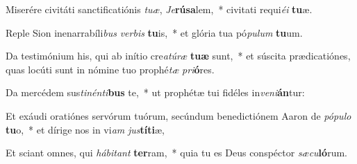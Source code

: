 \item Miserére civitáti sanctificatiónis \textit{tu}\textit{æ}, \textit{Je}\textbf{rú}\textbf{sa}lem,~* civitati requi\textit{é}\textit{i} \textbf{tu}æ.
\item Reple Sion inenarrabíli\textit{bus} \textit{ver}\textit{bis} \textbf{tu}is,~* et glória tua pó\textit{pu}\textit{lum} \textbf{tu}um.
\item Da testimónium his, qui ab inítio cre\textit{a}\textit{tú}\textit{ræ} \textbf{tu}\textbf{æ} sunt,~* et súscita prædicatiónes, quas locúti sunt in nómine tuo prophé\textit{tæ} \textit{pri}\textbf{ó}res.
\item Da mercédem sus\textit{ti}\textit{nén}\textit{ti}\textbf{bus} te,~* ut prophétæ tui fidéles in\textit{ve}\textit{ni}\textbf{án}tur:
\item Et exáudi oratiónes servórum tuórum, secúndum benedictiónem Aaron de \textit{pó}\textit{pu}\textit{lo} \textbf{tu}o,~* et dírige nos in vi\textit{am} \textit{jus}\textbf{tí}\textbf{ti}æ,
\item Et sciant omnes, qui \textit{há}\textit{bi}\textit{tant} \textbf{ter}ram,~* quia tu es Deus conspéctor \textit{sæ}\textit{cu}\textbf{ló}rum.
